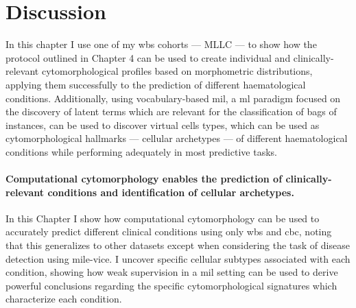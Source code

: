 \begin{figure}[!ht]
    \label{fig:glmnet-auc-validation-unbiased}
\end{figure}

\begin{figure}[!ht]
    \label{fig:mile-vice-auc-validation-unbiased}
\end{figure}

\FloatBarrier

\section{Discussion}

In this chapter I use one of my \ac{wbs} cohorts --- MLLC --- to show how the protocol outlined in Chapter 4 can be used to create individual and clinically-relevant cytomorphological profiles based on morphometric distributions, applying them successfully to the prediction of different haematological conditions. Additionally, using vocabulary-based \ac{mil}, a \ac{ml} paradigm focused on the discovery of latent terms which are relevant for the classification of bags of instances, can be used to discover virtual cells types, which can be used as cytomorphological hallmarks --- cellular archetypes --- of different haematological conditions while performing adequately in most predictive tasks.

\paragraph{Computational cytomorphology enables the prediction of clinically-relevant conditions and identification of cellular archetypes.} In this Chapter I show how computational cytomorphology can be used to accurately predict different clinical conditions using only \ac{wbs} and \ac{cbc}, noting that this generalizes to other datasets except when considering the task of disease detection using \ac{mile-vice}. I uncover specific cellular subtypes associated with each condition, showing how weak supervision in a \ac{mil} setting can be used to derive powerful conclusions regarding the specific cytomorphological signatures which characterize each condition. 

